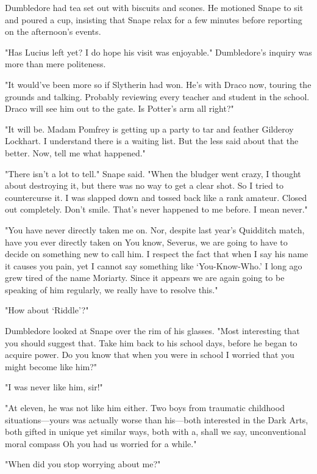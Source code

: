 \sbreak

Dumbledore had tea set out with biscuits and scones. He motioned Snape to sit and poured a cup, insisting that Snape relax for a few minutes before reporting on the afternoon's events.

"Has Lucius left yet? I do hope his visit was enjoyable." Dumbledore's inquiry was more than mere politeness.

"It would've been more so if Slytherin had won. He's with Draco now, touring the grounds and talking. Probably reviewing every teacher and student in the school. Draco will see him out to the gate. Is Potter's arm all right?"

"It will be. Madam Pomfrey is getting up a party to tar and feather Gilderoy Lockhart. I understand there is a waiting list. But the less said about that the better. Now, tell me what happened."

"There isn't a lot to tell." Snape said. "When the bludger went crazy, I thought about destroying it, but there was no way to get a clear shot. So I tried to countercurse it. I was slapped down and tossed back like a rank amateur. Closed out completely. Don't smile. That's never happened to me before. I mean never."

"You have never directly taken me on. Nor, despite last year's Quidditch match, have you ever directly taken on{\el} You know, Severus, we are going to have to decide on something new to call him. I respect the fact that when I say his name it causes you pain, yet I cannot say something like `You-Know-Who.' I long ago grew tired of the name Moriarty. Since it appears we are again going to be speaking of him regularly, we really have to resolve this."

"How about `Riddle'?"

Dumbledore looked at Snape over the rim of his glasses. "Most interesting that you should suggest that. Take him back to his school days, before he began to acquire power. Do you know that when you were in school I worried that you might become like him?"

"I was never like him, sir!"

"At eleven, he was not like him either. Two boys from traumatic childhood situations—yours was actually worse than his—both interested in the Dark Arts, both gifted in unique yet similar ways, both with a, shall we say, unconventional moral compass{\el} Oh you had us worried for a while."

"When did you stop worrying about me?"

